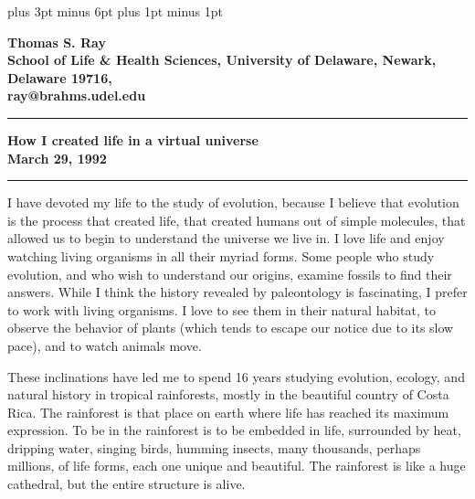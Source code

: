 %
%

\flushbottom
\textheight 9in
\textwidth 6.5in
\textfloatsep 30pt plus 3pt minus 6pt
\parskip 7.5pt plus 1pt minus 1pt
\oddsidemargin 0in
\evensidemargin 0in
\topmargin 0in
\headheight 0in
\headsep 0in

\def\XP{\par\begingroup\parindent 0in\everypar{\hangindent .3in}}
\def\eXP{\par\endgroup}

\def\LP{\par\begingroup\parindent 0in\everypar{\hangindent 0in}}
\def\eLP{\par\endgroup}


\thispagestyle{empty}

\LP
\bf Thomas S. Ray\rm \\
School of Life \& Health Sciences, University of Delaware, Newark, Delaware
19716,\\
ray@brahms.udel.edu\\
\rule[6pt]{6.5in}{1pt}
\Large \bf How I created life in a virtual universe\rm \normalsize\\
March 29, 1992\\
\rule[6pt]{6.5in}{2pt}
\eLP

I have devoted my life to the study of evolution, because I believe that
evolution is the process that created life, that created humans out of simple
molecules, that allowed us to begin to understand the universe we live in.
I love life and enjoy watching living organisms in all their myriad forms.
Some people who study evolution, and who wish to understand our origins,
examine fossils to find their answers.  While I think the history revealed by
paleontology is fascinating, I prefer to work with living organisms.  I love
to see them in their natural habitat, to observe the behavior of plants (which
tends to escape our notice due to its slow pace), and to watch animals move.

These inclinations have led me to spend 16 years studying evolution, ecology,
and natural history in tropical rainforests, mostly in the beautiful country
of Costa Rica.  The rainforest is that place on earth where life has reached
its maximum expression.  To be in the rainforest is to be embedded in life,
surrounded by heat, dripping water, singing birds, humming insects, many
thousands, perhaps millions, of life forms, each one unique and beautiful.
The rainforest is like a huge cathedral, but the entire structure is alive.

